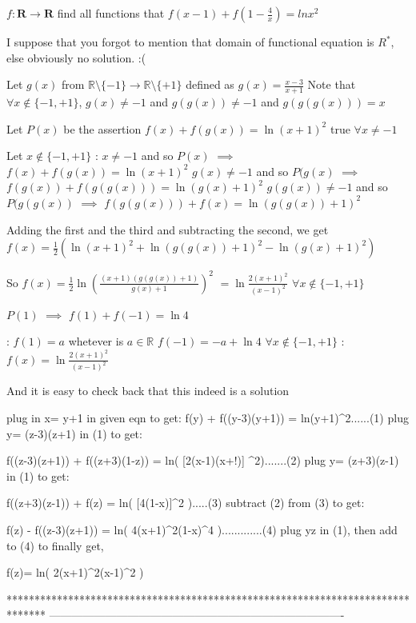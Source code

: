\begin{solution}
	\begin{tcolorbox}$f:\mathbf{R} \rightarrow \mathbf{R}$ find all functions that $f(x-1)+f(1-\frac{4}{x})=ln x^2$\end{tcolorbox}
I suppose that you forgot to mention that domain of functional equation is $R^*$, else obviously no solution. :(

Let $g(x)$ from $\mathbb R\setminus\{-1\}\to\mathbb R\setminus\{+1\}$ defined as $g(x)=\frac{x-3}{x+1}$
Note that $\forall x\notin\{-1,+1\}$, $g(x)\ne-1$ and $g(g(x))\ne -1$ and $g(g(g(x)))=x$

Let $P(x)$ be the assertion $f(x)+f(g(x))=\ln (x+1)^2$ true $\forall x\ne -1$

Let $x\notin\{-1,+1\}$ :
$x\ne -1$ and so $P(x)$ $\implies$ $f(x)+f(g(x))=\ln (x+1)^2$
$g(x)\ne -1$ and so $P(g(x)$ $\implies$ $f(g(x))+f(g(g(x)))=\ln (g(x)+1)^2$
$g(g(x))\ne -1$ and so $P(g(g(x))$ $\implies$ $f(g(g(x)))+f(x)=\ln (g(g(x))+1)^2$

Adding the first and the third and subtracting the second, we get $f(x)=\frac 12(\ln (x+1)^2+\ln (g(g(x))+1)^2-\ln (g(x)+1)^2)$

So $f(x)=\frac 12\ln\left(\frac{(x+1)(g(g(x))+1)}{g(x)+1}\right)^2$ $=\ln\frac{2(x+1)^2}{(x-1)^2}$ $\forall x\notin\{-1,+1\}$ 

$P(1)$ $\implies$ $f(1)+f(-1)=\ln 4$

 :
$f(1)=a$ whetever is $a\in\mathbb R$
$f(-1)=-a+\ln 4$
$\forall x\notin\{-1,+1\}$ : $f(x)=\ln\frac{2(x+1)^2}{(x-1)^2}$

And it is easy to check back that this indeed is a solution
\end{solution}



\begin{solution}
	plug in x= y+1 in given eqn to get: 
f(y) + f((y-3)\/(y+1)) = ln(y+1)^2......(1)
plug y= (z-3)\/(z+1) in (1) to get:

f((z-3)\/(z+1)) + f((z+3)\/(1-z)) = ln( [2(x-1)\/(x+!)] ^2).......(2)
plug y= (z+3)\/(z-1) in (1) to get:

f((z+3)\/(z-1)) + f(z) = ln( [4\/(1-x)]^2 ).....(3)
subtract (2) from (3) to get:

f(z) - f((z-3)\/(z+1)) = ln( 4(x+1)^2\/(1-x)^4 ).............(4)
plug yz in (1), then add to (4) to finally get, 

f(z)= ln( 2(x+1)^2\/(x-1)^2 )
\end{solution}
*******************************************************************************
-------------------------------------------------------------------------------

